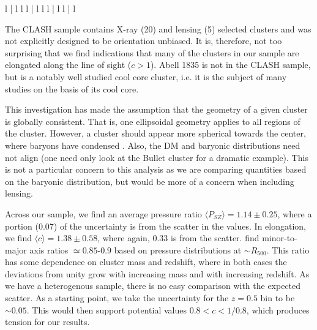 \documentclass[iop,numberedappendix,apj]{emulateapj}
\begin{document}
\begin{deluxetable*}{l | l l l | l l l | l l | l }
\enddata
{}
\end{deluxetable*}

The CLASH sample contains X-ray (20) and lensing (5) selected clusters and was not explicitly designed to
be orientation unbiased. It is, therefore, not too surprising that we find indications that many of the clusters 
in our sample are elongated along the line of sight ($c > 1$).
Abell 1835 is not in the CLASH sample, but is a notably well studied cool core cluster, i.e. it is the subject 
of many studies on the basis of its cool core.

This investigation has made the assumption that the geometry of a given cluster is globally consistent.
That is, one ellipsoidal geometry applies to all regions of the cluster. However, a cluster should appear 
more spherical towards the center, where baryons have
condensed \citep[e.g.][and references therein]{kravtsov2012}. Also, the DM and baryonic distributions
need not align (one need only look at the Bullet cluster \citep{Markevitch2004} for a dramatic example).
This is not a particular concern to this analysis as we are comparing quantities based on the baryonic
distribution, but would be more of a concern when including lensing. 

Across our sample, we find an average pressure ratio $\langle P_{SZ} \rangle = 1.14 \pm 0.25$, where a portion
($0.07$) of the uncertainty is from the scatter in the values. 
In elongation, we find $\langle c \rangle = 1.38 \pm 0.58$, where again,
$0.33$ is from the scatter. \citet{battaglia2012} find minor-to-major axis ratios $\simeq 0.85$-$0.9$ based on
pressure distributions at $\sim R_{500}$. This ratio has some dependence on cluster mass and redshift, where in
both cases the deviations from unity grow with increasing mass and with increasing redshift. As we have a 
heterogenous sample, there is no easy comparison with the expected scatter. As a starting point, we take the uncertainty
for the $z = 0.5$ bin to be $\sim 0.05$. This would then support potential values $0.8 < c < 1/0.8$, which
produces tension for our results.
\end{document}

